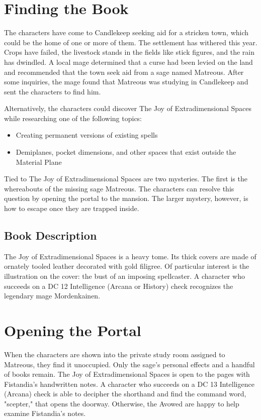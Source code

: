 \documentclass[10pt,a4paper,twoside,bg=print,twocolumn,openany,nodeprecatedcode]{dndbook}
\begin{document}
\section{Finding the Book}
The characters have come to Candlekeep seeking aid for a stricken town, which could be the home of one or more of them. The settlement has withered this year. Crops have failed, the livestock stands in the fields like stick figures, and the rain has dwindled. A local mage determined that a curse had been levied on the land and recommended that the town seek aid from a sage named Matreous. After some inquiries, the mage found that Matreous was studying in Candlekeep and sent the characters to find him.

Alternatively, the characters could discover The Joy of Extradimensional Spaces while researching one of the following topics:


\begin{itemize}
\item Creating permanent versions of existing spells
\item Demiplanes, pocket dimensions, and other spaces that exist outside the Material Plane
\end{itemize}

Tied to The Joy of Extradimensional Spaces are two mysteries. The first is the whereabouts of the missing sage Matreous. The characters can resolve this question by opening the portal to the mansion. The larger mystery, however, is how to escape once they are trapped inside.

\subsection{Book Description}
The Joy of Extradimensional Spaces is a heavy tome. Its thick covers are made of ornately tooled leather decorated with gold filigree. Of particular interest is the illustration on the cover: the bust of an imposing spellcaster. A character who succeeds on a DC 12 Intelligence (Arcana or History) check recognizes the legendary mage Mordenkainen.

\section{Opening the Portal}
When the characters are shown into the private study room assigned to Matreous, they find it unoccupied. Only the sage's personal effects and a handful of books remain. The Joy of Extradimensional Spaces is open to the pages with Fistandia's handwritten notes. A character who succeeds on a DC 13 Intelligence (Arcana) check is able to decipher the shorthand and find the command word, "scepter," that opens the doorway. Otherwise, the Avowed are happy to help examine Fistandia's notes.
\end{document}
